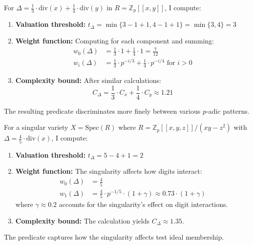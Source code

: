\begin{example}
For $\Delta = \frac{1}{3} \cdot \text{div}(x) + \frac{1}{4} \cdot \text{div}(y)$ in $R = \mathbb{Z}_p[[x,y]]$, I compute:

\begin{enumerate}
    \item \textbf{Valuation threshold:} $t_\Delta = \min\{3 - 1 + 1, 4 - 1 + 1\} = \min\{3, 4\} = 3$
    
    \item \textbf{Weight function:} Computing for each component and summing:
    \begin{align*}
    w_0(\Delta) &= \frac{1}{3} \cdot 1 + \frac{1}{4} \cdot 1 = \frac{7}{12} \\
    w_i(\Delta) &= \frac{1}{3} \cdot p^{-i/3} + \frac{1}{4} \cdot p^{-i/4} \text{ for } i > 0
    \end{align*}
    
    \item \textbf{Complexity bound:} After similar calculations:
    $$C_\Delta = \frac{1}{3} \cdot C_x + \frac{1}{4} \cdot C_y \approx 1.21$$
\end{enumerate}

The resulting predicate discriminates more finely between various $p$-adic patterns.
\end{example}

\begin{example}
For a singular variety $X = \text{Spec}(R)$ where $R = \mathbb{Z}_p[[x,y,z]]/(xy-z^2)$ with $\Delta = \frac{4}{5} \cdot \text{div}(x)$, I compute:

\begin{enumerate}
    \item \textbf{Valuation threshold:} $t_\Delta = 5 - 4 + 1 = 2$
    
    \item \textbf{Weight function:} The singularity affects how digits interact:
    \begin{align*}
    w_0(\Delta) &= \frac{4}{5} \\
    w_1(\Delta) &= \frac{4}{5} \cdot p^{-1/5} \cdot (1 + \gamma) \approx 0.73 \cdot (1 + \gamma)
    \end{align*}
    where $\gamma \approx 0.2$ accounts for the singularity's effect on digit interactions.
    
    \item \textbf{Complexity bound:} The calculation yields $C_\Delta \approx 1.35$.
\end{enumerate}

The predicate captures how the singularity affects test ideal membership.
\end{example}

